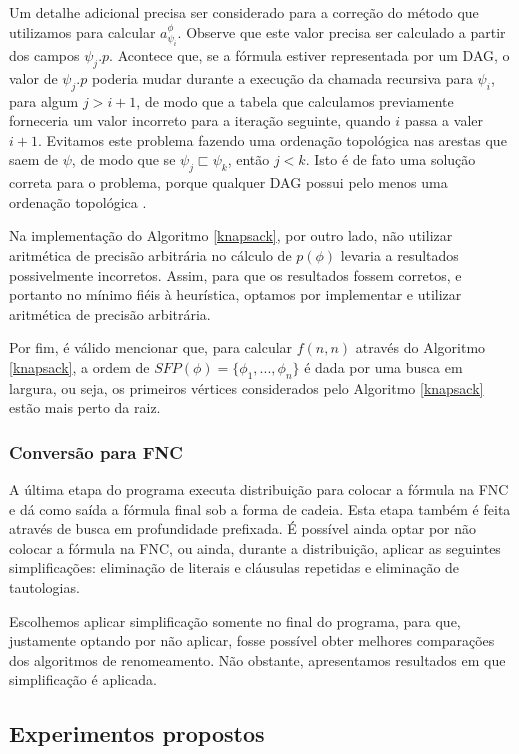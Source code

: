 Um detalhe adicional precisa ser considerado para a correção do método que utilizamos para calcular $a_{\psi_i}^\phi$. Observe que este valor precisa ser calculado a partir dos campos $\psi_j.p$. Acontece que, se a fórmula estiver representada por um DAG, o valor de $\psi_j.p$ poderia mudar durante a execução da chamada recursiva para $\psi_i$, para algum $j > i+1$, de modo que a tabela que calculamos previamente forneceria um valor incorreto para a iteração seguinte, quando $i$ passa a valer $i+1$. Evitamos este problema fazendo uma ordenação topológica nas arestas que saem de $\psi$, de modo que se $\psi_j \sqsubset \psi_k$, então $j < k$. Isto é de fato uma solução correta para o problema, porque qualquer DAG possui pelo menos uma ordenação topológica \cite{CLRS09}.

Na implementação do Algoritmo \ref{knapsack}, por outro lado, não utilizar aritmética de precisão arbitrária no cálculo de $p(\phi)$ levaria a resultados possivelmente incorretos. Assim, para que os resultados fossem corretos, e portanto no mínimo fiéis à heurística, optamos por implementar e utilizar aritmética de precisão arbitrária.

Por fim, é válido mencionar que, para calcular $f(n,n)$ através do Algoritmo \ref{knapsack}, a ordem de $SFP(\phi) = \{\phi_1,...,\phi_n \}$ é dada por uma busca em largura, ou seja, os primeiros vértices considerados pelo Algoritmo \ref{knapsack} estão mais perto da raiz.

\subsubsection{Conversão para FNC}

\indent

A última etapa do programa executa distribuição para colocar a fórmula na FNC e dá como saída a fórmula final sob a forma de cadeia. Esta etapa também é feita através de busca em profundidade prefixada. É possível ainda optar por não colocar a fórmula na FNC, ou ainda, durante a distribuição, aplicar as seguintes simplificações: eliminação de literais e cláusulas repetidas e eliminação de tautologias.

Escolhemos aplicar simplificação somente no final do programa, para que, justamente optando por não aplicar, fosse possível obter melhores comparações dos algoritmos de renomeamento. Não obstante, apresentamos resultados em que simplificação é aplicada.

\subsection{Experimentos propostos}

